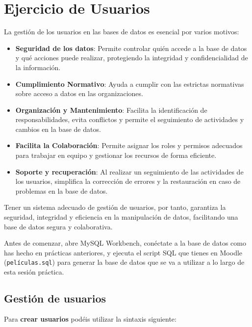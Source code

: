 \documentclass[a4paper]{article}
\begin{document}
\section*{Ejercicio de Usuarios}

La gestión de los usuarios en las bases de datos es esencial por varios motivos:

\begin{itemize}
    \item \textbf{Seguridad de los datos}: Permite controlar quién accede a la base de datos y qué acciones puede realizar, protegiendo la integridad y confidencialidad de la información.

    \item \textbf{Cumplimiento Normativo}: Ayuda a cumplir con las estrictas normativas sobre acceso a datos en las organizaciones.

    \item \textbf{Organización y Mantenimiento}: Facilita la identificación de responsabilidades, evita conflictos y permite el seguimiento de actividades y cambios en la base de datos.

    \item \textbf{Facilita la Colaboración}: Permite asignar los roles y permisos adecuados para trabajar en equipo y gestionar los recursos de forma eficiente.

    \item \textbf{Soporte y recuperación}: Al realizar un seguimiento de las actividades de los usuarios, simplifica la corrección de errores y la restauración en caso de problemas en la base de datos.
\end{itemize}

Tener un sistema adecuado de gestión de usuarios, por tanto, garantiza la seguridad, integridad y eficiencia en la manipulación de datos, facilitando una base de datos segura y colaborativa.

Antes de comenzar, abre MySQL Workbench, conéctate a la base de datos como has hecho en prácticas anteriores, y ejecuta el script SQL que tienes en Moodle (\texttt{películas.sql}) para generar la base de datos que se va a utilizar a lo largo de esta sesión práctica.

\subsection*{Gestión de usuarios}

Para \textbf{crear usuarios} podéis utilizar la sintaxis siguiente:
\end{document}
